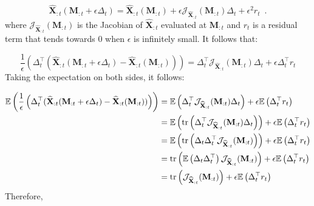\begin{equation*}
    \widehat{\mathbf{X}}_{:t}(\mathbf{M}_{:t} + \epsilon \Delta_t) =
    \widehat{\mathbf{X}}_{:t}(\mathbf{M}_{:t})
    + \epsilon \mathcal{J}_{\hat{\mathbf{X}}_{:t}}(\mathbf{M}_{:t}) \Delta_t
    + \epsilon^2 r_t
    \enspace .
\end{equation*}
%
where $\mathcal{J}_{\widehat{\mathbf{X}}_{:t}}(\mathbf{M}_{:t})$ is the Jacobian of $\widehat{\mathbf{X}}_{:t}$
evaluated at $\mathbf{M}_{:t}$ and $r_t$ is a residual term that tends towards 0 when $\epsilon$ is infinitely
small. It follows that:

\begin{equation*}
    \frac{1}{\epsilon}
        \left(
            \Delta_t^{\top} (\widehat{\mathbf{X}}_{:t}(\mathbf{M}_{:t}
            + \epsilon \Delta_t) - \widehat{\mathbf{X}}_{:t}(\mathbf{M}_{:t}))
        \right)
    =
    \Delta_t^{\top} \mathcal{J}_{\widehat{\mathbf{X}}_{:t}}(\mathbf{M}_{:t}) \Delta_t
    + \epsilon \Delta_t^{\top}r_t
\end{equation*}
%
Taking the expectation on both sides, it follows:

\begin{align*}
    \mathbb{E} \left(
        \frac{1}{\epsilon}
        \left(
            \Delta_t^{\top} (\widehat{\mathbf{X}}_{:t}(\mathbf{M}_{:t}
            + \epsilon \Delta_t) - \widehat{\mathbf{X}}_{:t}(\mathbf{M}_{:t}))
        \right)
    \right)
    &=
    \mathbb{E} \left(
        \Delta_t^{\top} \mathcal{J}_{\widehat{\mathbf{X}}_{:t}}(\mathbf{M}_{:t}) \Delta_t
    \right) + \epsilon \mathbb{E} \left( \Delta_t^{\top} r_t \right)\\
    &=
    \mathbb{E} \left(
        \operatorname{tr} \left(
            \Delta_t^{\top} \mathcal{J}_{\widehat{\mathbf{X}}_{:t}}(\mathbf{M}_{:t}) \Delta_t
        \right)
    \right) + \epsilon \mathbb{E} \left( \Delta_t^{\top} r_t \right)\\
    &=
    \mathbb{E} \left(
        \operatorname{tr} \left(
            \Delta_t \Delta_t^{\top} \mathcal{J}_{\widehat{\mathbf{X}}_{:t}}(\mathbf{M}_{:t})
        \right)
    \right) + \epsilon \mathbb{E} \left( \Delta_t^{\top} r_t \right)\\
    &=
    \operatorname{tr} \left(
        \mathbb{E} \left(
            \Delta_t \Delta_t^{\top}
        \right)
        \mathcal{J}_{\widehat{\mathbf{X}}_{:t}}(\mathbf{M}_{:t})
    \right) + \epsilon \mathbb{E} \left( \Delta_t^{\top} r_t \right)\\
    &=
    \operatorname{tr} \left(
        \mathcal{J}_{\widehat{\mathbf{X}}_{:t}}(\mathbf{M}_{:t})
    \right) + \epsilon \mathbb{E} \left( \Delta_t^{\top} r_t \right)
\end{align*}
%
Therefore,

